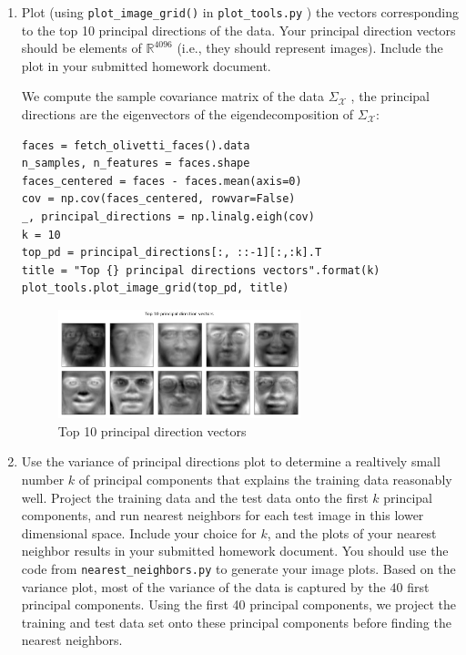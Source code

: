 \documentclass[12pt,twoside]{article}
\begin{document}
\begin{enumerate}
\begin{enumerate}
\item  Plot (using  \verb|plot_image_grid()| in
\verb|plot_tools.py| ) the vectors
corresponding to the top 10 principal directions of the data.
Your principal direction vectors should be elements of $\mathbb{R}^{4096}$ (i.e., they
should represent images).
Include the plot in your submitted homework document.

We compute the sample covariance matrix of the data $\Sigma_{\mathcal{X}}$ ,
 the principal directions are the eigenvectors of the eigendecomposition of  $\Sigma_{\mathcal{X}}$:
 
\begin{verbatim} 
faces = fetch_olivetti_faces().data
n_samples, n_features = faces.shape
faces_centered = faces - faces.mean(axis=0)
cov = np.cov(faces_centered, rowvar=False)
_, principal_directions = np.linalg.eigh(cov)
k = 10
top_pd = principal_directions[:, ::-1][:,:k].T
title = "Top {} principal directions vectors".format(k)
plot_tools.plot_image_grid(top_pd, title)
\end{verbatim}

	\begin{figure}[H]
		\centering
		\includegraphics[width=200pt]{figures/Top_10_principal_direction_vectors.pdf}
		\caption{Top 10 principal direction vectors}
		\label{fig7}
	\end{figure}


\item Use the variance of principal directions plot to determine a 
realtively small number $k$ of principal components
that explains the training data reasonably well.
Project the training data 
and the test data onto the
first $k$ principal components, and run nearest neighbors for
each test image in this lower dimensional space.  Include your
choice for $k$, and the plots
of your nearest neighbor results in your submitted homework
document.  You should use the code from
 \verb|nearest_neighbors.py| to generate your image plots.
Based on the variance plot, most of the variance of the data is captured by the $40$ first principal components. Using the first 40 principal components, we project the training
and test data set onto these principal components before finding the nearest neighbors.


\end{enumerate}
\end{enumerate}
\end{document}
